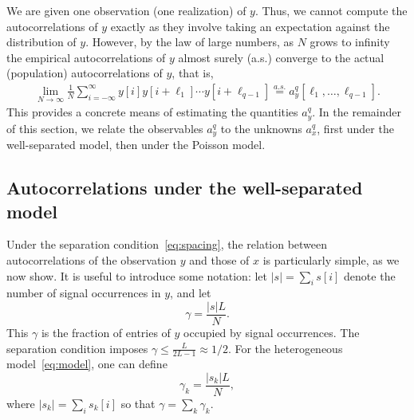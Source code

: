 \documentclass[12pt]{article}
\newcommand{\1}{\mathbf{1}}
\newcommand{\aseq}{\stackrel{a.s.}{=}}
\theoremstyle{plain}
\theoremstyle{definition}
\theoremstyle{remark}
\theoremstyle{plain}
\theoremstyle{remark}
\theoremstyle{plain}
\theoremstyle{plain}
\theoremstyle{plain}
\numberwithin{equation}{section}
\begin{document}
We are given one observation (one realization) of $y$. Thus, we cannot compute the autocorrelations of $y$ exactly as they involve taking an expectation against the distribution of $y$. However, by the law of large numbers, as $N$ grows to infinity  the empirical autocorrelations of $y$ almost surely (a.s.) converge to the actual (population) autocorrelations of $y$, that is, %
\begin{align}
\lim_{N \to \infty} \frac{1}{N} \sum_{i=-\infty}^{\infty} y[i]y[i+\ell_1]\cdots y[i+\ell_{q-1}] \aseq a_y^q[\ell_1, \ldots, \ell_{q-1}].
\end{align}
This provides a concrete means of estimating the quantities $a_y^ q$. In the remainder of this section, we relate the observables $a_y^q$  to the unknowns $a_x^q$, first under the well-separated model, then under the Poisson model.

\subsection{Autocorrelations under the well-separated model}

Under the separation condition~\eqref{eq:spacing}, the relation between autocorrelations of the observation $y$ and those of $x$ is particularly simple, as we now show. It is useful to introduce some notation: let $\vert s\vert = \sum_i s[i]$ denote the number of signal occurrences in $y$, and let
\begin{equation}
\gamma  = \frac{|s| L}{N}.
\label{eq:gamma}
\end{equation}
This $\gamma$ is the fraction of entries of $y$ occupied by signal occurrences. %
The separation condition  imposes $\gamma\leq\frac{L}{2L-1}\approx 1/2$. 
For the heterogeneous model~\eqref{eq:model},  one can define
\begin{equation}
\gamma_k  = \frac{|s_k| L}{N},
\label{eq:gamma_k}
\end{equation}
where $\vert s_k\vert = \sum_i s_k[i]$ so that $\gamma=\sum_k \gamma_k$.
\end{document}
